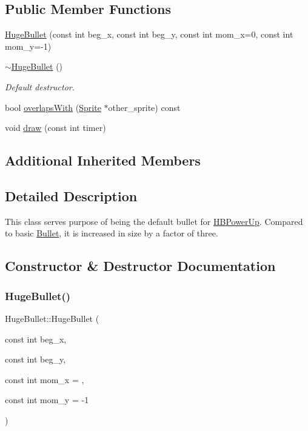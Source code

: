 \subsection*{Public Member Functions}
\begin{DoxyCompactItemize}
\item 
\hyperlink{classHugeBullet_a5a486a2079e6e7bd9d97bd40c68c5f85}{Huge\+Bullet} (const int beg\+\_\+x, const int beg\+\_\+y, const int mom\+\_\+x=0, const int mom\+\_\+y=-\/1)
\item 
\hyperlink{classHugeBullet_abdd0ba93e0edc39a7ad94a7f5f38a138}{$\sim$\+Huge\+Bullet} ()
\begin{DoxyCompactList}\small\item\em Default destructor. \end{DoxyCompactList}\item 
bool \hyperlink{classHugeBullet_a6a617486739894eacb79711c8a24bb9d}{overlaps\+With} (\hyperlink{classSprite}{Sprite} $\ast$other\+\_\+sprite) const
\item 
void \hyperlink{classHugeBullet_a0c4f11d7d892b683ecf601cdc37c6ebf}{draw} (const int timer)
\end{DoxyCompactItemize}
\subsection*{Additional Inherited Members}


\subsection{Detailed Description}
This class serves purpose of being the default bullet for \hyperlink{classHBPowerUp}{H\+B\+Power\+Up}. Compared to basic \hyperlink{classBullet}{Bullet}, it is increased in size by a factor of three. 

\subsection{Constructor \& Destructor Documentation}
\mbox{\label{classHugeBullet_a5a486a2079e6e7bd9d97bd40c68c5f85}} 
\subsubsection{\texorpdfstring{Huge\+Bullet()}{HugeBullet()}}
{\footnotesize\ttfamily Huge\+Bullet\+::\+Huge\+Bullet (\begin{DoxyParamCaption}\item[{const int}]{beg\+\_\+x,  }\item[{const int}]{beg\+\_\+y,  }\item[{const int}]{mom\+\_\+x = {},  }\item[{const int}]{mom\+\_\+y = {\ttfamily -\/1} }\end{DoxyParamCaption})}

